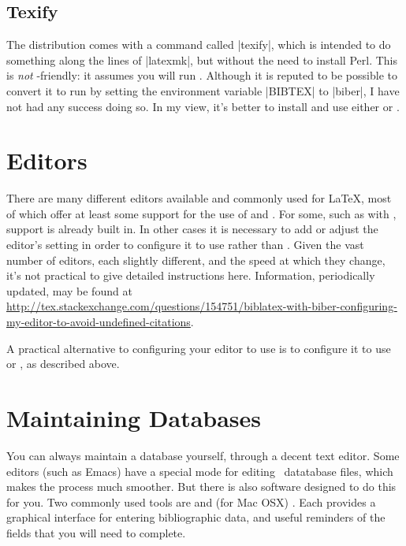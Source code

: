 \subsection{Texify}

The  distribution comes with a command called
|texify|, which is intended to do something along the lines of
|latexmk|, but without the need to install Perl. This is \emph{not}
-friendly: it assumes you will run \bibtex. Although it
is reputed to be possible to convert it to run  by
setting the environment variable |BIBTEX| to |biber|, I have not had
any success doing so. In my view, it's better to install and use
either  or .

\section{Editors}

There are many different editors available and commonly used for
\LaTeX, most of which offer at least some support for the use of
 and . For some, such as
 with , support is already built
in. In other cases it is necessary to add or adjust the editor's
setting in order to configure it to use  rather than
\bibtex. Given the vast number of editors, each slightly different,
and the speed at which they change, it's not practical to give
detailed instructions here. Information, periodically updated, may be
found at
\url{http://tex.stackexchange.com/questions/154751/biblatex-with-biber-configuring-my-editor-to-avoid-undefined-citations}.

A practical alternative to configuring your editor to use
 is to configure it to use  or
, as described above.

\section{Maintaining Databases}

You can always maintain a database yourself, through a decent text
editor. Some editors (such as Emacs) have a special mode for editing
\bibtex\ datatabase files, which makes the process much smoother. But
there is also software designed to do this for you. Two commonly used
tools are  and (for Mac OSX) . Each
provides a graphical interface for entering bibliographic data, and
useful reminders of the fields that you will need to complete.

